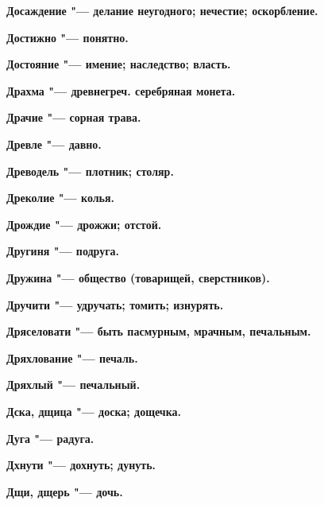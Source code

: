 \begin{multicols}{2}
\bfseries Досаждение\normalfont{} "--- делание неугодного; нечестие; оскорбление. 




\bfseries Достижно\normalfont{} "--- понятно. 




\bfseries Достояние\normalfont{} "--- имение; наследство; власть. 




\bfseries Драхма\normalfont{} "--- древнегреч. серебряная монета. 




\bfseries Драчие\normalfont{} "--- сорная трава. 




\bfseries Древле\normalfont{} "--- давно. 




\bfseries Древодель\normalfont{} "--- плотник; столяр. 




\bfseries Дреколие\normalfont{} "--- колья. 




\bfseries Дрождие\normalfont{} "--- дрожжи; отстой. 




\bfseries Другиня\normalfont{} "--- подруга. 




\bfseries Дружина\normalfont{} "--- общество (товарищей, сверстников). 




\bfseries Дручити\normalfont{} "--- удручать; томить; изнурять. 




\bfseries Дряселовати\normalfont{} "--- быть пасмурным, мрачным, печальным. 




\bfseries Дряхлование\normalfont{} "--- печаль. 




\bfseries Дряхлый\normalfont{} "--- печальный. 




\bfseries Дска, дщица\normalfont{} "--- доска; дощечка. 




\bfseries Дуга\normalfont{} "--- радуга. 




\bfseries Дхнути\normalfont{} "--- дохнуть; дунуть. 




\bfseries Дщи, дщерь\normalfont{} "--- дочь. 





\end{multicols}
